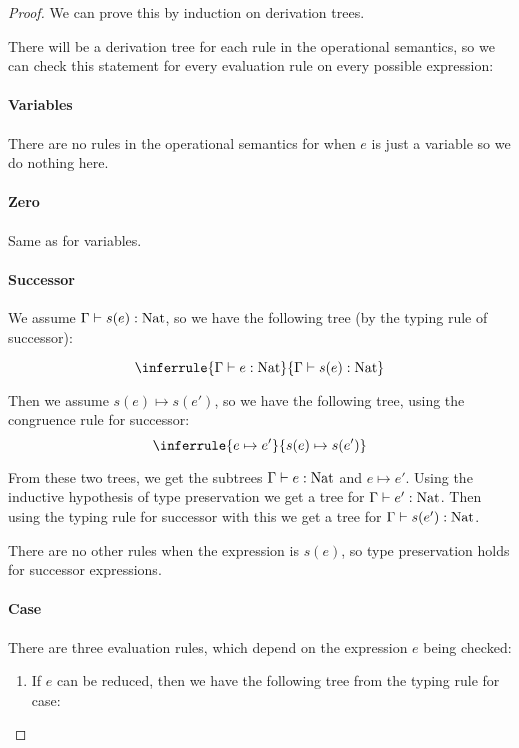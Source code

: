 \begin{proof}
We can prove this by induction on derivation trees.%

There will be a derivation tree  for each rule in the operational semantics, so we can check this statement for every evaluation rule on every possible expression:

\paragraph{Variables} There are no rules in the operational semantics for when $e$ is just a variable so we do nothing here.

\paragraph{Zero} Same as for variables.

\paragraph{Successor} We  assume $\Gamma \vdash s(e) : \operatorname{Nat}$, so we have the following tree (by the typing rule of successor):

$$
\inferrule { \Gamma \vdash e : \nat }
 {\Gamma \vdash s(e) : \nat}
$$

Then we assume $s(e) \mapsto s(e')$, so we have the following tree, using the congruence rule for successor:
$$
\inferrule { e \mapsto e'} {s(e) \mapsto s(e')}
$$

From these two trees, we get the subtrees $\Gamma \vdash e : \operatorname{Nat}$ and $e \mapsto e'$. Using the inductive  hypothesis of type preservation we get a tree for $\Gamma \vdash e' : \operatorname{Nat}$. Then using the typing rule for successor with this we get a tree for $\Gamma \vdash s(e') : \operatorname{Nat}$. 

There are no other rules when the expression is $s(e)$, so type preservation holds for successor expressions.  

\paragraph{Case} There are three evaluation rules, which depend on the expression $e$ being checked:

\begin{enumerate}
\item{If $e$ can be reduced, then we have the following tree from the typing rule for case:

}
\end{enumerate}
\end{proof}
